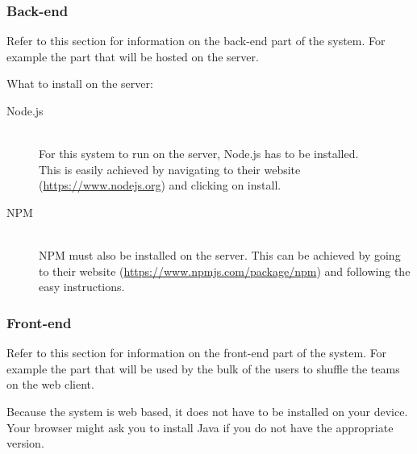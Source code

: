 \subsubsection{Back-end}
	Refer to this section for information on the back-end part of the system. For example the part that will be hosted on the server.\par
	\vspace{0.3cm}
	
What to install on the server:
\begin{description} 
\item[Node.js] \hfill 
\\ For this system to run on the server, Node.js has to be installed.
\\ This is easily achieved by navigating to their website (\href{https://www.nodejs.org}{https://www.nodejs.org}) and clicking on install. 
\item[NPM] \hfill 
\\ NPM must also be installed on the server.  This can be achieved by going to their website  (\href{https://www.npmjs.com/package/npm}{https://www.npmjs.com/package/npm}) and following the easy instructions. 
\end{description}

\subsubsection{Front-end}
	Refer to this section for information on the front-end part of the system. For example the part that will be	used by the bulk of the users to shuffle the teams on the web client.\par
	\vspace{0.3cm}
	
Because the system is web based, it does not have to be installed on your device. 
Your browser might ask you to install Java if you do not have the appropriate version.